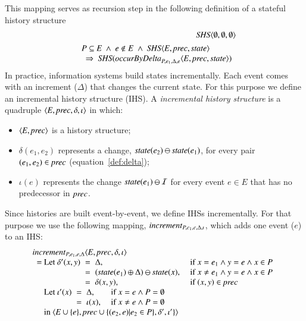\documentclass{elsarticle}
\def\id#1{\text{\em #1\/}}
\def\Events{{\mathit E}}
\begin{document}
	This mapping serves as recursion step in the following definition of a stateful history structure
\begin{eqnarray}
	&&\id{SHS}\la \emptyset, \emptyset, \emptyset\ra\\
&&\begin{array}{@{}l}
	P\subseteq\Events\ \wedge\ e\notin E\ \wedge\ \id{SHS}\la \Events, \id{prec}, \id{state}\ra\\
	\ \ \Rightarrow\ \id{SHS}(\id{occurByDelta}_{P,e_1,\Delta,e}\la \Events, \id{prec}, \id{state}\ra)
\end{array}
\label{req:recursive def SHS by Delta}
\end{eqnarray}
	In practice, information systems build states incrementally.
	Each event comes with an increment ($\Delta$) that changes the current state.
	For this purpose we define an incremental history structure (IHS).
	A {\em incremental history structure} is a quadruple $\la\Events, \id{prec}, \delta, \iota\ra$ in which:
\begin{itemize}
\item	$\la \Events, \id{prec}\ra$ is a history structure;
\item	$\delta(e_1,e_2)$ represents a change, $\id{state}(e_2)\ominus\id{state}(e_1)$, for every pair $(e_1,e_2)\in\id{prec}$ (equation~\ref{def:delta});
\item	$\iota(e)$ represents the change $\id{state}(e_1)\ominus\mathcal I$ for every event $e\in\Events$ that has no predecessor in $\id{prec}$.
\end{itemize}
	Since histories are built event-by-event, we define IHSs incrementally.
	For that purpose we use the following mapping, $\id{increment}_{P,e_1,e,\Delta,\iota}$,
	which adds one event ($e$) to an IHS:
\begin{eqnarray}
\begin{array}{l@{}l}
	\multicolumn{2}{l}{\id{increment}_{P,e_1,e,\Delta}\la\Events, \id{prec}, \delta, \iota\ra}\\
	\ \ =\ &\begin{array}[t]{@{}l@{\hspace{0.2cm}}c@{\hspace{0.2cm}}ll}
		\text{Let }\delta'(x,y)&=&\Delta\text{, }&\text{if }x=e_1\wedge y=e\wedge x\in P\\
				       &=&(\id{state}(e_1)\oplus\Delta)\ominus\id{state}(x)\text{, }&\text{if }x\neq e_1\wedge y=e\wedge x\in P\\
				       &=&\delta(x,y)\text{, }&\text{if }(x,y)\in\id{prec}
		\end{array}\\
		&\begin{array}[t]{@{}l@{\hspace{0.2cm}}c@{\hspace{0.2cm}}ll}
			\text{Let }\iota'(x)&=&\Delta\text{, }&\text{if }x=e\wedge P=\emptyset\\
				    &=&\iota(x)\text{, }&\text{if }x\neq e\wedge P=\emptyset
		\end{array}\\
		&\text{in }\la\Events\cup\{e\}, \id{prec}\cup\{(e_2,e)|e_2\in P\}, \delta', \iota'\}\ra
\end{array}
\label{req:increment}
\end{eqnarray}
\end{document}
